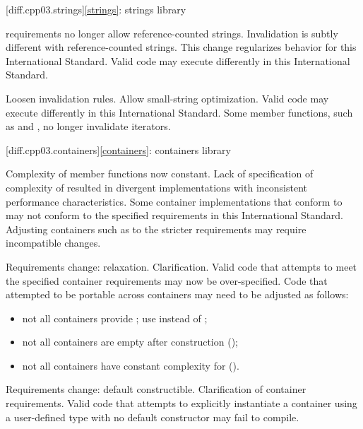 [diff.cpp03.strings]{\ref{strings}: strings library}

\change
{} requirements no longer allow reference-counted
strings.
\rationale
Invalidation is subtly different with reference-counted strings.
This change regularizes behavior for this International Standard.
\effect
Valid \CppIII{} code may execute differently in this International Standard.

\change
Loosen  invalidation rules.
\rationale
Allow small-string optimization.
\effect
Valid \CppIII{} code may execute differently in this International Standard.
Some  member functions, such as  and ,
no longer invalidate iterators.

[diff.cpp03.containers]{\ref{containers}: containers library}

\change
Complexity of  member functions now constant.
\rationale
Lack of specification of complexity of  resulted in
divergent implementations with inconsistent performance characteristics.
\effect
Some container implementations that conform to \CppIII{} may not conform to the
specified  requirements in this International Standard. Adjusting
containers such as  to the stricter requirements may require
incompatible changes.

\change
Requirements change: relaxation.
\rationale
Clarification.
\effect
Valid \CppIII{} code that attempts to meet the specified container requirements
may now be over-specified. Code that attempted to be portable across containers
may need to be adjusted as follows:
\begin{itemize}
\item not all containers provide ; use  instead
of ;
\item not all containers are empty after construction ();
\item not all containers have constant complexity for  ().
\end{itemize}

\change
Requirements change: default constructible.
\rationale
Clarification of container requirements.
\effect
Valid \CppIII{} code that attempts to explicitly instantiate a container using
a user-defined type with no default constructor may fail to compile.

